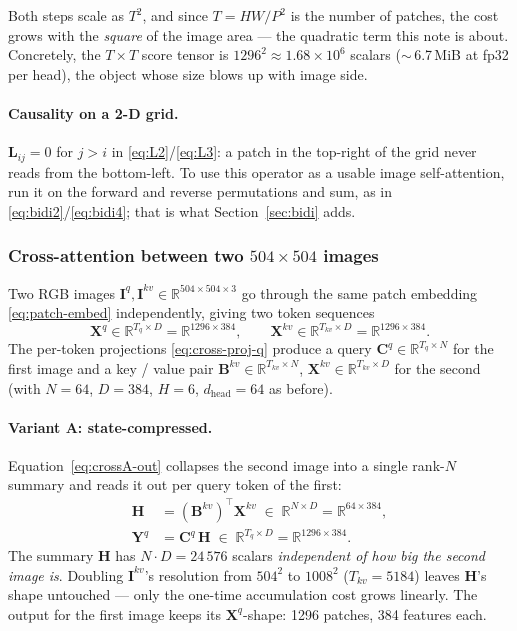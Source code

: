 \documentclass[11pt,a4paper]{article}
\begin{document}
\medskip
Both steps scale as $T^{2}$, and since $T = HW/P^{2}$ is the number of
patches, the cost grows with the \emph{square} of the image area --- the
quadratic term this note is about. Concretely, the $T\times T$ score
tensor is $1296^{2}\approx 1.68\!\times\!10^{6}$ scalars
($\sim$\,6.7\,MiB at fp32 per head), the object whose size blows up with
image side.

\paragraph{Causality on a 2-D grid.}
$\bm{L}_{ij}=0$ for $j>i$ in \eqref{eq:L2}/\eqref{eq:L3}: a patch in
the top-right of the grid never reads from the bottom-left. To use
this operator as a usable image self-attention, run it on the forward
and reverse permutations and sum, as in
\eqref{eq:bidi2}/\eqref{eq:bidi4}; that is what
Section~\ref{sec:bidi} adds.

\subsubsection{Cross-attention between two \texorpdfstring{$504\!\times\!504$}{504x504} images}
\label{sec:cross-worked}

Two RGB images $\bm{I}^q,\bm{I}^{kv}\in\mathbb{R}^{504\times 504\times 3}$
go through the same patch embedding \eqref{eq:patch-embed} independently,
giving two token sequences
\begin{equation}
  \bm{X}^{q}\in\mathbb{R}^{T_q\times D}=\mathbb{R}^{1296\times 384},
  \qquad
  \bm{X}^{kv}\in\mathbb{R}^{T_{kv}\times D}=\mathbb{R}^{1296\times 384}.
\end{equation}
The per-token projections \eqref{eq:cross-proj-q} produce a query
$\bm{C}^q\in\mathbb{R}^{T_q\times N}$ for the first image and a key /
value pair $\bm{B}^{kv}\in\mathbb{R}^{T_{kv}\times N}$,
$\bm{X}^{kv}\in\mathbb{R}^{T_{kv}\times D}$ for the second (with
$N=64$, $D=384$, $H=6$, $d_{\text{head}}=64$ as before).

\paragraph{Variant A: state-compressed.}
Equation~\eqref{eq:crossA-out} collapses the
second image into a single rank-$N$ summary and reads it out per
query token of the first:
\begin{align}
  \bm{H} &= (\bm{B}^{kv})^\top \bm{X}^{kv}
        \;\in\;\mathbb{R}^{N\times D} = \mathbb{R}^{64\times 384}, \\
  \bm{Y}^q &= \bm{C}^q\,\bm{H}
        \;\in\;\mathbb{R}^{T_q\times D} = \mathbb{R}^{1296\times 384}.
\end{align}
The summary $\bm{H}$ has $N\!\cdot\!D = 24\,576$ scalars
\emph{independent of how big the second image is}. Doubling
$\bm{I}^{kv}$'s resolution from $504^{2}$ to $1008^{2}$ ($T_{kv}\!=\!5184$)
leaves $\bm{H}$'s shape untouched — only the one-time accumulation cost
grows linearly. The output for the first image keeps its
$\bm{X}^{q}$-shape: 1296 patches, 384 features each.
\end{document}
